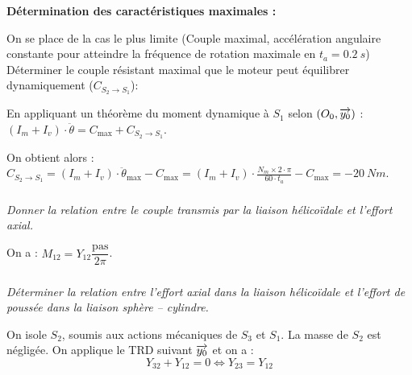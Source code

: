 \documentclass[10pt,fleqn]{article} %
\begin{document}
\begin{multicols}{2}
\begin{multicols}{2}
\begin{corrige}
\textbf{Détermination des caractéristiques maximales : }


On se place de la cas le plus limite (Couple maximal, accélération angulaire constante pour atteindre la fréquence de rotation maximale en $t_a=\SI{0,2}{s}$)
Déterminer le couple résistant maximal que le moteur peut équilibrer dynamiquement ($C_{S_2\to S_1}$):

En appliquant un théorème du moment dynamique à $S_1$ selon $\left(O_0,\overrightarrow{{y}_0}\right)$ :
$(I_m+I_v)\cdot \ddot{\theta}=C_{\text{max}}+C_{S_2\to S_1}$. 

On obtient alors : 
$C_{S_2\to S_1}=(I_m+I_v)\cdot \ddot{\theta}_{\text{max}}-C_{\text{max}}=(I_m+I_v)\cdot \frac{N_m\times 2\cdot \pi}{60\cdot t_a}-C_{\text{max}}=-\SI{20}{Nm}$.



\end{corrige}
\else
\fi


\subparagraph{}
\textit{Donner la relation entre le couple transmis par la liaison hélicoïdale et l'effort axial.}
\ifprof
\begin{corrige}
On a : $M_{12}=Y_{12}\dfrac{\text{pas}}{2\pi}$.
\end{corrige}
\else
\fi
\subparagraph{}
\textit{Déterminer la relation entre l'effort axial dans la liaison hélicoïdale et l'effort de poussée dans la liaison sphère -- cylindre.}
\ifprof
\begin{corrige}
On isole $S_2$, soumis aux actions mécaniques de $S_3$ et $S_1$. La masse de $S_2$ est négligée. 
On applique le TRD suivant $\overrightarrow{y_0}$ et on a : 
$$
Y_{32}+Y_{12}=0 \Leftrightarrow 
Y_{23}=Y_{12}
$$
\end{corrige}
\else
\fi



\end{multicols}
\end{multicols}
\end{document}
